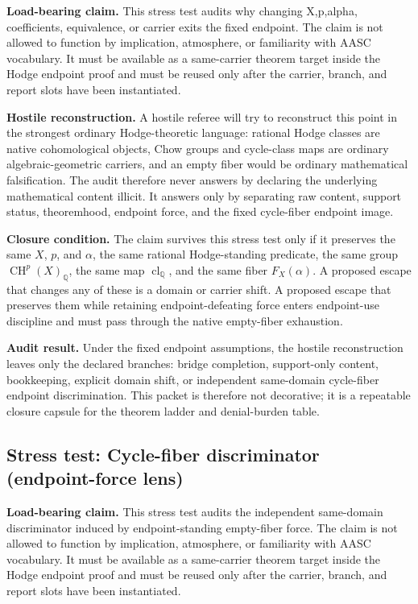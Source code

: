 \documentclass[11pt]{article}
\newcommand{\QQ}{\mathbb{Q}}
\newcommand{\CH}{\operatorname{CH}}
\newcommand{\clQ}{\operatorname{cl}_{\QQ}}
\begin{document}
\par\noindent\textbf{Load-bearing claim.} This stress test audits why changing X,p,alpha, coefficients, equivalence, or carrier exits the fixed endpoint. The claim is not allowed to function by implication, atmosphere, or familiarity with AASC vocabulary. It must be available as a same-carrier theorem target inside the Hodge endpoint proof and must be reused only after the carrier, branch, and report slots have been instantiated.

\par\noindent\textbf{Hostile reconstruction.} A hostile referee will try to reconstruct this point in the strongest ordinary Hodge-theoretic language: rational Hodge classes are native cohomological objects, Chow groups and cycle-class maps are ordinary algebraic-geometric carriers, and an empty fiber would be ordinary mathematical falsification. The audit therefore never answers by declaring the underlying mathematical content illicit. It answers only by separating raw content, support status, theoremhood, endpoint force, and the fixed cycle-fiber endpoint image.

\par\noindent\textbf{Closure condition.} The claim survives this stress test only if it preserves the same $X$, $p$, and $\alpha$, the same rational Hodge-standing predicate, the same group $\CH^p(X)_\QQ$, the same map $\clQ$, and the same fiber $F_X(\alpha)$. A proposed escape that changes any of these is a domain or carrier shift. A proposed escape that preserves them while retaining endpoint-defeating force enters endpoint-use discipline and must pass through the native empty-fiber exhaustion.

\par\noindent\textbf{Audit result.} Under the fixed endpoint assumptions, the hostile reconstruction leaves only the declared branches: bridge completion, support-only content, bookkeeping, explicit domain shift, or independent same-domain cycle-fiber endpoint discrimination. This packet is therefore not decorative; it is a repeatable closure capsule for the theorem ladder and denial-burden table.


\subsection{Stress test: Cycle-fiber discriminator (endpoint-force lens)}

\par\noindent\textbf{Load-bearing claim.} This stress test audits the independent same-domain discriminator induced by endpoint-standing empty-fiber force. The claim is not allowed to function by implication, atmosphere, or familiarity with AASC vocabulary. It must be available as a same-carrier theorem target inside the Hodge endpoint proof and must be reused only after the carrier, branch, and report slots have been instantiated.
\end{document}
